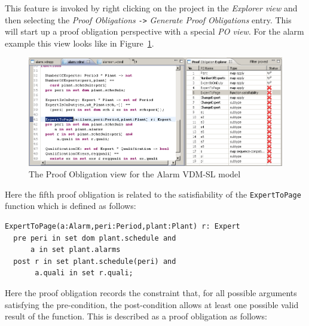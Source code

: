 {This feature is invoked by right clicking on the project in the
\emph{Explorer view} and then selecting the \emph{Proof Obligations}
\texttt{->} \emph{Generate Proof Obligations} entry. This will start up a proof
obligation perspective with a special \emph{PO view}. For the alarm
example this view looks like in Figure~\ref{fig:POview}.
\begin{figure}[htbp]
\begin{center}
\caption{The Proof Obligation view for the Alarm VDM-SL model\label{fig:POview}}
\includegraphics[width=4.5in]{figures/POview}
\end{center}
\end{figure}
Here the fifth proof obligation is related to the satisfiability of
the \texttt{ExpertToPage} function which is defined as follows: 

\begin{lstlisting}
ExpertToPage(a:Alarm,peri:Period,plant:Plant) r: Expert
  pre peri in set dom plant.schedule and
      a in set plant.alarms
  post r in set plant.schedule(peri) and
       a.quali in set r.quali;
\end{lstlisting}


Here the proof obligation records the constraint that, for all
possible arguments satisfying the pre-condition, the post-condition
allows at least one possible valid result of the function. This is
described as a proof obligation as follows:

}
